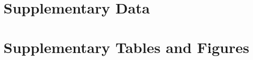 \documentclass[utf8]{frontiers_suppmat} %
\begin{document}
\onecolumn
{}

\title[Supplementary Material]{{}}


\maketitle


\section{Supplementary Data}



\section{Supplementary Tables and Figures}



\end{document}
